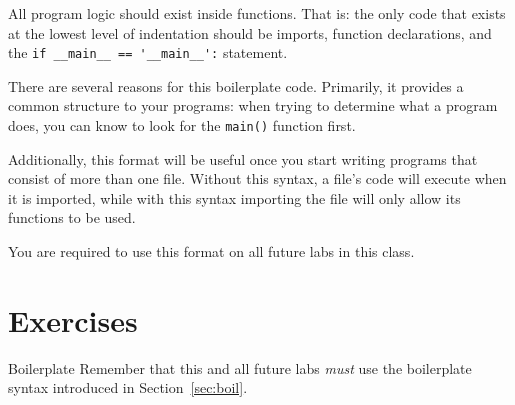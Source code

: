 \documentclass[11pt]{cselabheader}
\begin{document}
All program logic should exist inside functions. That is: the only code that
exists at the lowest level of indentation should be imports, function
declarations, and the \lstinline{if __main__ == '__main__':} statement.

There are several reasons for this boilerplate code. Primarily, it provides a
common structure to your programs: when trying to determine what a program
does, you can know to look for the \lstinline{main()} function first.

Additionally, this format will be useful once you start writing programs that
consist of more than one file. Without this syntax, a file's code will execute
when it is imported, while with this syntax importing the file will only allow
its functions to be used.

You are required to use this format on all future labs in this class.

\pagebreak
\section{Exercises}
\label{sec:ex}

\begin{warningbox}{Boilerplate}
  Remember that this and all future labs \emph{must} use the
  boilerplate syntax introduced in Section~\ref{sec:boil}.
\end{warningbox}
\end{document}
